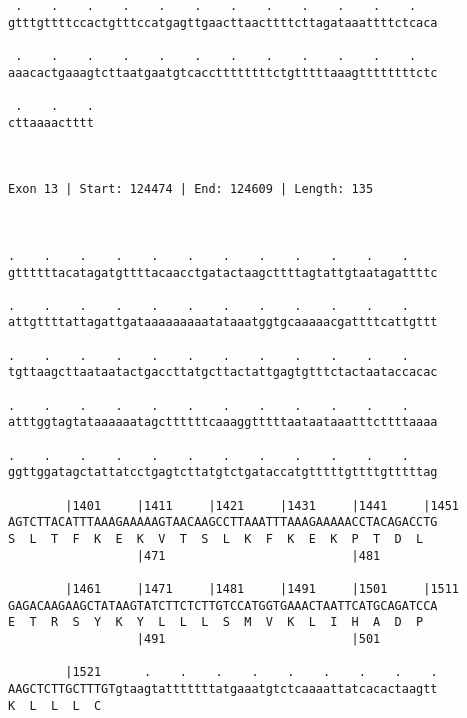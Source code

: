 \documentclass{article}
\begin{document}
\begin{Verbatim}
 .    .    .    .    .    .    .    .    .    .    .    .   
gtttgttttccactgtttccatgagttgaacttaacttttcttagataaattttctcaca
                                                            
 .    .    .    .    .    .    .    .    .    .    .    .   
aaacactgaaagtcttaatgaatgtcaccttttttttctgtttttaaagttttttttctc
                                                            
 .    .    .
cttaaaactttt
            
            
 
Exon 13 | Start: 124474 | End: 124609 | Length: 135



.    .    .    .    .    .    .    .    .    .    .    .    
gttttttacatagatgttttacaacctgatactaagcttttagtattgtaatagattttc
                                                            
.    .    .    .    .    .    .    .    .    .    .    .    
attgttttattagattgataaaaaaaaatataaatggtgcaaaaacgattttcattgttt
                                                            
.    .    .    .    .    .    .    .    .    .    .    .    
tgttaagcttaataatactgaccttatgcttactattgagtgtttctactaataccacac
                                                            
.    .    .    .    .    .    .    .    .    .    .    .    
atttggtagtataaaaaatagcttttttcaaaggtttttaataataaatttcttttaaaa
                                                            
.    .    .    .    .    .    .    .    .    .    .    .    
ggttggatagctattatcctgagtcttatgtctgataccatgtttttgttttgtttttag
                                                            
        |1401     |1411     |1421     |1431     |1441     |1451
AGTCTTACATTTAAAGAAAAAGTAACAAGCCTTAAATTTAAAGAAAAACCTACAGACCTG
S  L  T  F  K  E  K  V  T  S  L  K  F  K  E  K  P  T  D  L  
                  |471                          |481        
  
        |1461     |1471     |1481     |1491     |1501     |1511
GAGACAAGAAGCTATAAGTATCTTCTCTTGTCCATGGTGAAACTAATTCATGCAGATCCA
E  T  R  S  Y  K  Y  L  L  L  S  M  V  K  L  I  H  A  D  P  
                  |491                          |501        
  
        |1521      .    .    .    .    .    .    .    .    .
AAGCTCTTGCTTTGTgtaagtatttttttatgaaatgtctcaaaattatcacactaagtt
K  L  L  L  C                                               
                                                            

\end{Verbatim}
\end{document}
